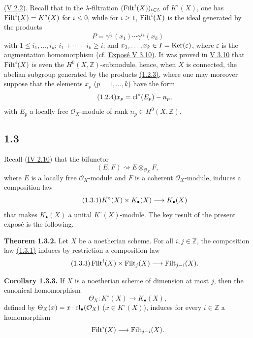 (\hyperlink{sga6.e05.ex.2-2}{V 2.2}). Recall that in the $\lambda$-filtration
$(\operatorname{Filt}^i(X))_{i\in\mathbb Z}$ of $K^\circ(X)$, one has
$\operatorname{Filt}^i(X)=K^\circ(X)$ for $i\leq0$, while for $i\geq1$, $\operatorname{Filt}^i(X)$ is
the ideal generated by the products
\begin{equation}\tag{1.2.3}
P=\gamma^{i_1}(x_1)\cdots\gamma^{i_k}(x_k)
\end{equation}
with $1\leq i_1,\ldots,i_k$; $i_1+\cdots+i_k\geq i$; and
$x_1,\ldots,x_k\in I=\operatorname{Ker}(\varepsilon)$, where $\varepsilon$ is the
augmentation homomorphism (cf. \hyperlink{sga6.e05.para.3-10}{Expos\'e V 3.10)}. It was proved in \hyperlink{sga6.e05.para.3-10}{V 3.10} that
$\operatorname{Filt}^i(X)$ is even the $H^0(X,\mathbb Z)$-submodule, hence, when $X$ is
connected, the abelian subgroup generated by the products \hyperlink{sga6.e10.eq.1-2-3}{(1.2.3)}, where one
may moreover suppose that the elements $x_p$ ($p=1,\ldots,k$) have the form
\begin{equation}\tag{1.2.4}
x_p=\operatorname{cl}^\circ(E_p)-n_p,
\end{equation}
with $E_p$ a locally free $\mathcal O_X$-module of rank
$n_p\in H^0(X,\mathbb Z)$.

\subsection*{1.3}
Recall (\hyperlink{sga6.e04.para.2-10}{IV 2.10}) that the bifunctor
\[
(E,F)\rightsquigarrow E\otimes_{\mathcal O_X}F,
\]
where $E$ is a locally free $\mathcal O_X$-module and $F$ is a coherent
$\mathcal O_X$-module, induces a composition law
\begin{equation}\tag{\sgaStableTargetInline{sga6.e10.eq.1-3-1}1.3.1}
K^\circ(X)\times K_\bullet(X)\longrightarrow K_\bullet(X)
\end{equation}
that makes $K_\bullet(X)$ a unital $K^\circ(X)$-module. The key result of the
present expos\'e is the following.

\textbf{Theorem 1.3.2.}
Let $X$ be a noetherian scheme. For all $i,j\in\mathbb Z$, the composition law
\hyperlink{sga6.e10.eq.1-3-1}{(1.3.1)} induces by restriction a composition law
\begin{equation}\tag{1.3.3}
\operatorname{Filt}^i(X)\times\operatorname{Filt}_j(X)\longrightarrow\operatorname{Filt}_{j-i}(X).
\end{equation}

\textbf{Corollary 1.3.3.}
If $X$ is a noetherian scheme of dimension at most $j$, then the canonical
homomorphism
\[
\Theta_X:K^\circ(X)\longrightarrow K_\bullet(X),
\]
defined by $\Theta_X(x)=x\cdot\operatorname{cl}_\bullet(\mathcal O_X)$
($x\in K^\circ(X)$), induces for every $i\in\mathbb Z$ a homomorphism
\[
\operatorname{Filt}^i(X)\longrightarrow\operatorname{Filt}_{j-i}(X).
\]

